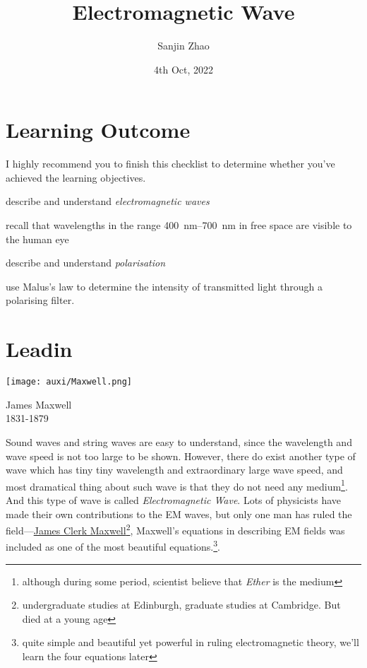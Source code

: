\documentclass[a4paper]{tufte-handout}
\title{Electromagnetic Wave}
\author{Sanjin Zhao}
\date{4th Oct, 2022}  %
\begin{document}
\maketitle%
\section*{Learning Outcome}
I highly recommend you to finish this checklist to determine whether you've achieved the learning objectives.
\begin{todolist}
  \item describe and understand \emph{electromagnetic waves}
  \item recall that wavelengths in the range \SIrange{400}{700}{\nm} in free space are visible to the human eye
  \item describe and understand \emph{polarisation}
  \item use Malus’s law to determine the intensity of transmitted light through a polarising filter.
\end{todolist}
\clearpage

\section{Leadin}
\begin{marginfigure}
\texttt{[image: auxi/Maxwell.png]}
\caption{James Maxwell\\1831-1879}
\end{marginfigure}
Sound waves and string waves are easy to understand, since the wavelength and wave speed is not too large to be shown. However, there do exist another type of wave which has tiny tiny wavelength and extraordinary large wave speed, and most dramatical thing about such wave is that they do not need any medium\footnote{although during some period, scientist believe that \emph{Ether} is the medium}. And this type of wave is called \emph{Electromagnetic Wave}. Lots of physicists have made their own contributions to the EM waves, but only one man has ruled the field---\href{https://en.wikipedia.org/wiki/James_Clerk_Maxwell}{James Clerk Maxwell}\footnote{undergraduate studies at Edinburgh, graduate studies at Cambridge. But died at a young age}, Maxwell's equations in describing EM fields was included as one of the most beautiful equations.\footnote{quite simple and beautiful yet powerful in ruling electromagnetic theory, we'll learn the four equations later}.
\end{document}
